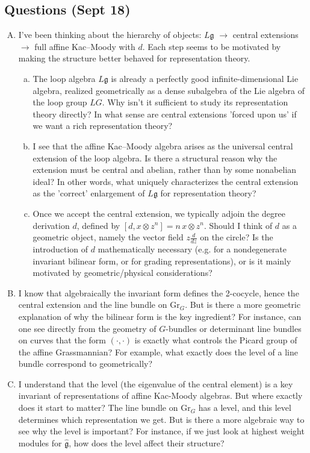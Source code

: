 \documentclass[12pt]{article}
\begin{document}
\subsection*{Questions (Sept 18)}
\begin{enumerate}[A.]
    \item I've been thinking about the hierarchy of objects: $L\mathfrak g$ $\to$ central extensions $\to$ full affine Kac–Moody with $d$. Each step seems to be motivated by making the structure better behaved for representation theory.
          \begin{enumerate}[a)]
              \item The loop algebra $L\mathfrak g$ is already a perfectly good infinite-dimensional Lie algebra, realized geometrically as a dense subalgebra of the Lie algebra of the loop group $LG$. Why isn't it sufficient to study its representation theory directly? In what sense are central extensions 'forced upon us' if we want a rich representation theory?
              \item I see that the affine Kac–Moody algebra arises as the universal central extension of the loop algebra. Is there a structural reason why the extension must be central and abelian, rather than by some nonabelian ideal? In other words, what uniquely characterizes the central extension as the 'correct' enlargement of $L\mathfrak g$ for representation theory?
              \item Once we accept the central extension, we typically adjoin the degree derivation $d$, defined by $[d, x\otimes z^n]=n\,x\otimes z^n$. Should I think of $d$ as a geometric object, namely the vector field $z\frac{d}{dz}$ on the circle? Is the introduction of $d$ mathematically necessary (e.g. for a nondegenerate invariant bilinear form, or for grading representations), or is it mainly motivated by geometric/physical considerations?
          \end{enumerate}
    \item I know that algebraically the invariant form defines the 2-cocycle, hence the central extension and the line bundle on $\mathrm{Gr}_G$. But is there a more geometric explanation of why the bilinear form is the key ingredient? For instance, can one see directly from the geometry of $G$-bundles or determinant line bundles on curves that the form $(\cdot,\cdot)$ is exactly what controls the Picard group of the affine Grassmannian? For example, what exactly does the level of a line bundle correspond to geometrically?
    \item I understand that the level (the eigenvalue of the central element) is a key invariant of representations of affine Kac-Moody algebras. But where exactly does it start to matter? The line bundle on $\mathrm{Gr}_G$ has a level, and this level determines which representation we get. But is there a more algebraic way to see why the level is important? For instance, if we just look at highest weight modules for $\widehat{\mathfrak g}$, how does the level affect their structure?
\end{enumerate}
\end{document}
